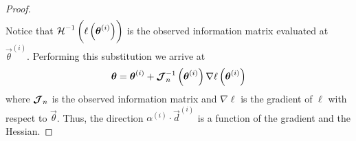 \documentclass[
    11pt,
    extrafontsizes,
    article,
    oldfontcommands,
    final,
    oneside,
    openany,
    hidelinks]{memoir}
\begin{document}
\begin{proof}
\begin{align*}
\end{align*}
Notice that $\operatorname{\mathcal{H}}^{-1} \left( \ell \left(\boldsymbol{\mathbf{\theta}}^{(i)}\right) \right )$ is the observed information matrix evaluated at $\vec\theta^{(i)}$. Performing this substitution we arrive at
\begin{equation*}
    \boldsymbol{\mathbf{\theta}} = \boldsymbol{\mathbf{\theta}}^{(i)} + \operatorname{\boldsymbol{\mathcal{J}}}^{-1}_n \left(\boldsymbol{\mathbf{\theta}}^{(i)}\right ) \nabla \ell \left(\boldsymbol{\mathbf{\theta}}^{(i)}\right)
\end{equation*}
where $\operatorname{\boldsymbol{\mathcal{J}}}_n$ is the observed information matrix and $\nabla \ell$ is the gradient of $\ell$ with respect to $\vec\theta$. Thus, the direction $\alpha^{(i)} \cdot \vec{d}^{(i)}$ is a function of the gradient and the Hessian.
\end{proof}
\end{document}
